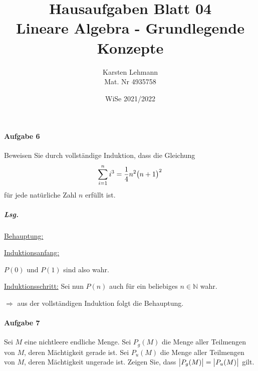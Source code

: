 \documentclass{scrreprt}
\author{Karsten Lehmann\\Mat. Nr 4935758}
\date{WiSe 2021/2022}
\title{Hausaufgaben Blatt 04\\Lineare Algebra - Grundlegende Konzepte}
\begin{document}
\paragraph{Aufgabe 6} Beweisen Sie durch vollständige Induktion, dass die
Gleichung
\[
  \sum_{i = 1}^{n}i^3 = \frac{1}{4}n^2 \qty\big(n + 1)^2
\]
für jede natürliche Zahl $n$ erfüllt ist.
\subparagraph{Lsg.}
\underline{Behauptung:}

\underline{Induktionsanfang:}
$P(0)$ und $P(1)$ sind also wahr.

\underline{Induktionsschritt:}
Sei nun $P(n)$ auch für ein beliebiges $n \in \mathbb{N}$ wahr.

$\Rightarrow$ aus der vollständigen Induktion folgt die Behauptung.

\newpage
\paragraph{Aufgabe 7} Sei $M$ eine nichtleere endliche Menge.
Sei $P_g(M)$ die Menge aller Teilmengen von $M$, deren Mächtigkeit gerade ist.
Sei $P_u(M)$ die Menge aller Teilmengen von $M$, deren Mächtigkeit ungerade ist.
Zeigen Sie, dass $\abs\big{P_g(M)} = \abs\big{P_u(M)}$ gilt.
\end{document}
